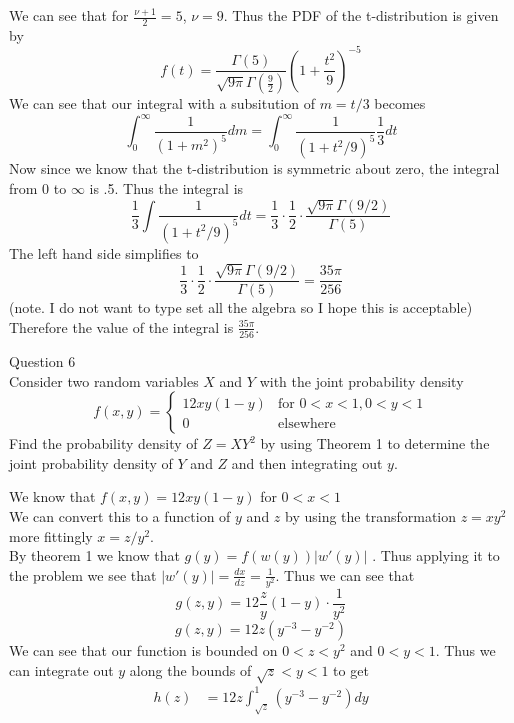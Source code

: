 \documentclass[answers,12pt,addpoints]{exam}
\begin{document}
\begin{questions}
\begin{solution}
        We can see that for $\frac{\nu +1 }{2} = 5$, $\nu = 9$. Thus the PDF of the t-distribution is given by
        \[ f(t) = \frac{\Gamma \left( 5 \right)}{\sqrt{9 \pi} \Gamma\left( \frac{9}{2} \right)} \left(1 + \frac{t^2}{9}\right)^{-5} \]
        We can see that our integral with a subsitution of $m = t/3$ becomes
        $$ \int_0^\infty \frac{1}{(1+m^2)^{5}}dm = \int_0^\infty \frac{1}{(1+t^2/9)^{5}}\frac{1}{3}dt$$
        Now since we know that the t-distribution is symmetric about zero, the integral from $0$ to $\infty$ is .5. Thus the integral is
        $$ \frac{1}{3} \int \frac{1}{(1+t^2/9)^{5}}dt = \frac{1}{3} \cdot \frac{1}{2} \cdot \frac{\sqrt{9\pi} \Gamma(9/2)}{\Gamma(5)} $$
        The left hand side simplifies to
        $$ \frac{1}{3} \cdot \frac{1}{2} \cdot \frac{\sqrt{9\pi} \Gamma(9/2)}{\Gamma(5)} = \frac{35 \pi}{256}$$ 
        (note. I do not want to type set all the algebra so I hope this is acceptable)\\
        Therefore the value of the integral is $\frac{35 \pi}{256}$.
    \end{solution}
    \question Question 6\\
    Consider two random variables \( X \) and \( Y \) with the joint probability density
    \[ 
    f(x, y) = 
    \begin{cases} 
    12xy(1 - y) & \text{for } 0 < x < 1, 0 < y < 1 \\ 
    0 & \text{elsewhere} 
    \end{cases} 
    \]
    Find the probability density of \( Z = XY^2 \) by using Theorem 1 to determine the joint probability density of \( Y \) and \( Z \) and then integrating out \( y \).
    \begin{solution}
        We know that $f(x,y) = 12xy(1-y)$ for $0 < x < 1$\\
        We can convert this to a function of $y$ and $z$ by using the transformation $z = xy^2$ more fittingly $x = z/y^2$.\\
        By theorem 1 we know that $g(y) = f(w(y)) |w'(y)|$ . Thus applying it to the problem we see that $|w'(y)| = \frac{dx}{dz} = \frac{1}{y^2}$. Thus we can see that
        $$ g(z,y) = 12 \frac{z}{y}(1-y) \cdot \frac{1}{y^2} $$
        $$ g(z,y) = 12z (y^{-3} - y^{-2}) $$ 
        We can see that our function is bounded on $0 < z < y^2$ and $0 < y < 1$. Thus we can integrate out $y$ along the bounds of $\sqrt{z} < y < 1$ to get
        \begin{align*}
            h(z) &= 12z \int_{\sqrt{z}}^{1} (y^{-3} - y^{-2})dy \\

\end{align*}
\end{solution}
\end{questions}
\end{document}
